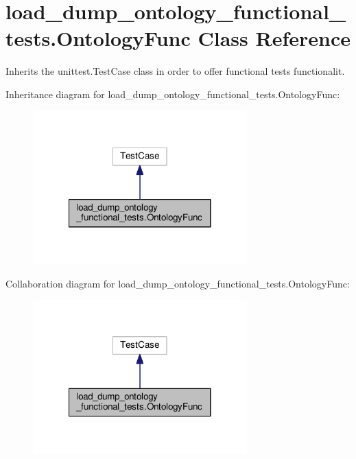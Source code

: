 \hypertarget{classload__dump__ontology__functional__tests_1_1OntologyFunc}{\section{load\-\_\-dump\-\_\-ontology\-\_\-functional\-\_\-tests.\-Ontology\-Func Class Reference}
\label{classload__dump__ontology__functional__tests_1_1OntologyFunc}
}


Inherits the unittest.\-Test\-Case class in order to offer functional tests functionalit.  




Inheritance diagram for load\-\_\-dump\-\_\-ontology\-\_\-functional\-\_\-tests.\-Ontology\-Func\-:
\nopagebreak
\begin{figure}[H]
\begin{center}
\leavevmode
\includegraphics[width=234pt]{classload__dump__ontology__functional__tests_1_1OntologyFunc__inherit__graph}
\end{center}
\end{figure}


Collaboration diagram for load\-\_\-dump\-\_\-ontology\-\_\-functional\-\_\-tests.\-Ontology\-Func\-:
\nopagebreak
\begin{figure}[H]
\begin{center}
\leavevmode
\includegraphics[width=234pt]{classload__dump__ontology__functional__tests_1_1OntologyFunc__coll__graph}
\end{center}
\end{figure}

